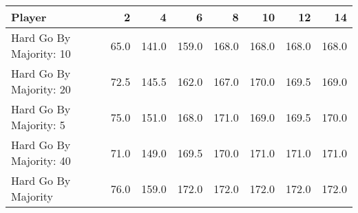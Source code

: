 \begin{tabular}{lrrrrrrr}
\toprule
                  Player &     2 &      4 &      6 &      8 &     10 &     12 &     14 \\
\midrule
 Hard Go By Majority: 10 &  65.0 &  141.0 &  159.0 &  168.0 &  168.0 &  168.0 &  168.0 \\
 Hard Go By Majority: 20 &  72.5 &  145.5 &  162.0 &  167.0 &  170.0 &  169.5 &  169.0 \\
  Hard Go By Majority: 5 &  75.0 &  151.0 &  168.0 &  171.0 &  169.0 &  169.5 &  170.0 \\
 Hard Go By Majority: 40 &  71.0 &  149.0 &  169.5 &  170.0 &  171.0 &  171.0 &  171.0 \\
     Hard Go By Majority &  76.0 &  159.0 &  172.0 &  172.0 &  172.0 &  172.0 &  172.0 \\
\bottomrule
\end{tabular}
